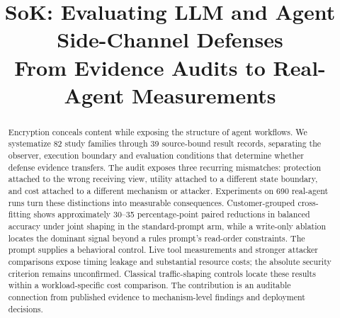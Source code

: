 \documentclass[conference,compsoc]{IEEEtran}
\title{SoK: Evaluating LLM and Agent Side-Channel Defenses\\From Evidence Audits to Real-Agent Measurements}
\author{}
\begin{document}
\maketitle

\begin{abstract}
Encryption conceals content while exposing the structure of agent workflows. We systematize 82 study families through 39 source-bound result records, separating the observer, execution boundary and evaluation conditions that determine whether defense evidence transfers. The audit exposes three recurring mismatches: protection attached to the wrong receiving view, utility attached to a different state boundary, and cost attached to a different mechanism or attacker. Experiments on 690 real-agent runs turn these distinctions into measurable consequences. Customer-grouped cross-fitting shows approximately 30--35 percentage-point paired reductions in balanced accuracy under joint shaping in the standard-prompt arm, while a write-only ablation locates the dominant signal beyond a rules prompt's read-order constraints. The prompt supplies a behavioral control. Live tool measurements and stronger attacker comparisons expose timing leakage and substantial resource costs; the absolute security criterion remains unconfirmed. Classical traffic-shaping controls locate these results within a workload-specific cost comparison. The contribution is an auditable connection from published evidence to mechanism-level findings and deployment decisions.
\end{abstract}















\clearpage
\appendices

\end{document}
